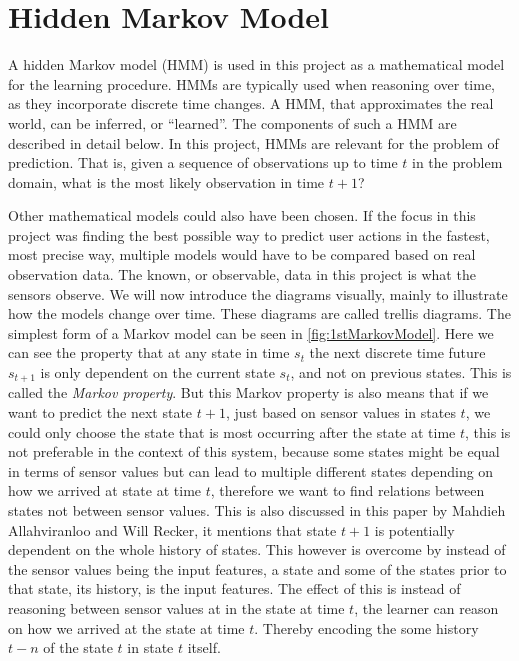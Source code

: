 \section{Hidden Markov Model}
\label{sec:hmm}
A hidden Markov model (HMM) is used in this project as a mathematical model for the learning procedure. HMMs are typically used when reasoning over time, as they incorporate discrete time changes. A HMM, that approximates the real world, can be inferred, or \enquote{learned}. The components of such a HMM are described in detail below. In this project, HMMs are relevant for the problem of prediction. That is, given a sequence of observations up to time $t$ in the problem domain, what is the most likely observation in time $t+1$?

Other mathematical models could also have been chosen. If the focus in this project was finding the best possible way to predict user actions in the fastest, most precise way, multiple models would have to be compared based on real observation data.
The known, or observable, data in this project is what the sensors observe. 
We will now introduce the diagrams visually, mainly to illustrate how the models change over time. These diagrams are called trellis diagrams. The simplest form of a Markov model can be seen in \cref{fig:1stMarkovModel}. Here we can see the property that at any state in time $s_t$ the next discrete time future $s_{t+1}$ is only dependent on the current state $s_t$, and not on previous states. This is called the \emph{Markov property}. But this Markov property is also means that if we want to predict the next state $t+1$, just based on sensor values in states $t$, we could only choose the state that is most occurring after the state at time $t$, this is not preferable in the context of this system, because some states might be equal in terms of sensor values but can lead to multiple different states depending on how we arrived at state at time $t$, therefore we want to find relations between states not between sensor values. This is also discussed in this paper\cite{Allahviranloo201316} by Mahdieh Allahviranloo and Will Recker, it mentions that state $t+1$ is potentially dependent on the whole history of states. This however is overcome by instead of the sensor values being the input features, a state and some of the states prior to that state, its history, is the input features. The effect of this is instead of reasoning between sensor values at in the state at time $t$, the learner can reason on how we arrived at the state at time $t$. Thereby encoding the some history $t-n$ of the state $t$ in state $t$ itself.

